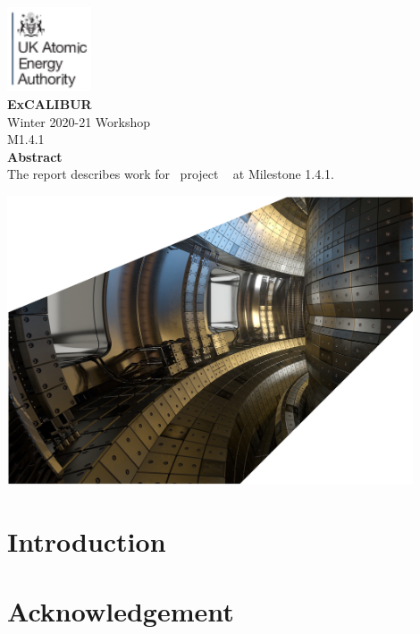 \documentclass[11pt,twoside,a4paper]{article}
\newcommand{\culhamtitle}{\LARGE Winter 2020-21 Workshop  \\[1.0\baselineskip] M1.4.1 }%
\begin{document}
\begin{titlepage}%
\vspace*{-30mm}%
\includegraphics[width=2.5cm]{../corpics/cofaplus} \\[2.0\baselineskip]%
{\LARGE {\textbf{\textsf{ExCALIBUR}}}}\\[2.0\baselineskip]%
{\LARGE \culhamtitle } \\[2.0\baselineskip]%
{\textbf{\textsf{Abstract}}}\\%
The report describes work for \exc \ project \nep \ %
at Milestone 1.4.1. %
\vfill%
\centerline{\includegraphics[width=0.9\textwidth]{../corpics/tokintcrop}}%
\end{titlepage}%



\clearpage
\section{Introduction}\label{sec:intro}

\clearpage

\clearpage

\section*{Acknowledgement}\label{sec:ackn}




\end{document}
